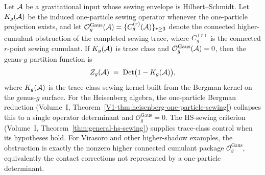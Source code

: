 \begin{theorem}
Let $\mathcal{A}$ be a gravitational input whose sewing envelope is
Hilbert--Schmidt. Let \(K_g(\mathcal{A})\) be the induced one-particle sewing
operator whenever the one-particle projection exists, and let
\(\mathcal O^{\mathrm{Gaus}}_g(\mathcal{A})=\{C^{(r)}_g(\mathcal{A})\}_{r\ge3}\)
denote the connected higher-cumulant obstruction of the completed
sewing trace, where \(C^{(r)}_g\) is the connected \(r\)-point sewing
cumulant. If \(K_g(\mathcal{A})\) is trace class and
\(\mathcal O^{\mathrm{Gaus}}_g(\mathcal{A})=0\), then the genus-$g$ partition
function is
\begin{equation}%
Z_g(\cA) \;=\; \Det\bigl(1 - K_g(\cA)\bigr),
\end{equation}
where \(K_g(\mathcal{A})\) is the trace-class sewing kernel built from the
Bergman kernel on the genus-$g$ surface. For the Heisenberg algebra,
the one-particle Bergman reduction
(Volume~I, Theorem~\ref{V1-thm:heisenberg-one-particle-sewing})
collapses this to a single operator determinant and
\(\mathcal O^{\mathrm{Gaus}}_g=0\). The HS-sewing criterion
(Volume~I, Theorem~\ref{thm:general-hs-sewing}) supplies trace-class
control when its hypotheses hold. For Virasoro and other higher-shadow
examples, the obstruction is exactly the nonzero higher connected
cumulant package \(\mathcal O^{\mathrm{Gaus}}_g\), equivalently the
contact corrections not represented by a one-particle determinant.
\end{theorem}

